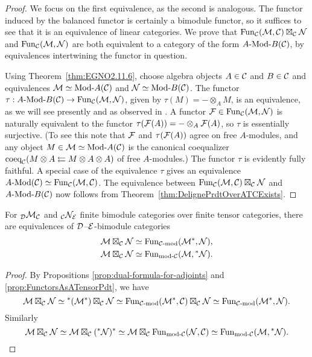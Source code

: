\documentclass{amsart}
\begin{document}
\begin{proof}
We focus on the first equivalence, as the second is analogous.  The functor induced by the balanced functor is certainly a bimodule functor, so it suffices to see that it is an equivalence of linear categories.  We prove that $\operatorname{Fun}_\mathcal C(\mathcal M, \mathcal C) \boxtimes_\mathcal C \mathcal N$ and $\operatorname{Fun}_\mathcal C(\mathcal M,\mathcal N)$ are both equivalent to a category of the form $\Mod{A}{B}(\cC)$, by equivalences intertwining the functor in question.

Using Theorem~\ref{thm:EGNO2.11.6}, choose algebra objects $A \in \mathcal C$ and $B \in \mathcal C$ and equivalences $\cM \simeq \Mod{}{A}(\cC)$ and $\cN \simeq \Mod{}{B}(\cC)$.  The functor $\tau: \Mod{A}{B}(\cC) \rightarrow \Fun_\cC(\cM,\cN)$, given by $\tau(M) = - \otimes_A M$, is an equivalence, as we will see presently and as observed in \cite[Prop 2.12.2]{EGNO}.  A functor $\mathcal F \in \operatorname{Fun}_\mathcal C(\mathcal M,\mathcal N)$ is naturally equivalent to the functor $\tau(\mathcal F(A)) = - \otimes_A \mathcal F(A)$, so $\tau$ is essentially surjective.  (To see this note that $\mathcal F$ and $\tau(\mathcal F(A))$ agree on free $A$-modules, and any object $M \in \cM \simeq \Mod{}{A}(\cC)$ is the canonical coequalizer $\textrm{coeq}_\mathcal C(M \otimes A \leftleftarrows M \otimes A \otimes A)$ of free $A$-modules.)  The functor $\tau$ is evidently fully faithful.  A special case of the equivalence $\tau$ gives an equivalence $\Mod{A}{}(\cC) \simeq \Fun_\cC(\cM,\cC)$.  The equivalence between $\operatorname{Fun}_\mathcal C(\mathcal M, \mathcal C) \boxtimes_\mathcal C \mathcal N$ and $\Mod{A}{B}(\cC)$ now follows from Theorem~\ref{thm:DelignePrdtOverATCExists}.
\end{proof}

\begin{corollary} \label{cor:tensasfunct}
For ${}_\mathcal D \mathcal M_\mathcal C$ and ${}_\mathcal C \mathcal N_\mathcal E$ finite bimodule categories over finite tensor categories, there are equivalences of $\mathcal D$--$\mathcal E$-bimodule categories
\begin{align*}
\cM \boxtimes_\cC \cN &\simeq \Fun_{\mod{\cC}{}}(\cM^*,\cN), \\
\cM \boxtimes_\cC \cN &\simeq \Fun_{\mod{}{\cC}}(\cM,{}^* \cN).
\end{align*}
\end{corollary}
\begin{proof}
By Propositions \ref{prop:dual-formula-for-adjoints} and \ref{prop:FunctorsAsATensorPdt}, we have
\[
\cM \boxtimes_\cC \cN \simeq {}^*(\cM^*) \boxtimes_\cC \cN \simeq \Fun_{\mod{\cC}{}}(\cM^*,\cC) \boxtimes_\cC \cN \simeq \Fun_{\mod{\cC}{}}(\cM^*,\cN).
\]
Similarly
\[
\cM \boxtimes_\cC \cN \simeq \cM \boxtimes_\cC ({}^* \cN)^* \simeq \cM \boxtimes_\cC \Fun_{\mod{}{\cC}}(\cN,\cC) \simeq \Fun_{\mod{}{\cC}}(\cM,{}^* \cN).\qedhere
\]
\end{proof}
\end{document}
